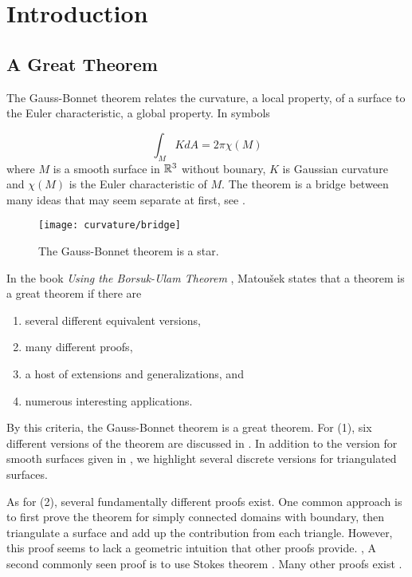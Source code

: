 \section{Introduction}
\label{sec:intro}

\subsection{A Great Theorem}
The Gauss-Bonnet theorem relates the curvature, a local property, of a surface
to the Euler characteristic, a global property. In symbols 

\begin{equation}\label{eqn:g-b-noboundary}
		\int_MK dA =2\pi \chi(M)
\end{equation}
where $M$ is a smooth surface in $\mathbb{R}^3$ without bounary, $K$ is Gaussian curvature
and $\chi(M)$ is the Euler characteristic of $M$.
The theorem is a bridge between many ideas that may
seem separate at first, see . 




\begin{figure}[htb]
\centering
\texttt{[image: curvature/bridge]}
\caption{The Gauss-Bonnet theorem is a star.}
\label{fig:bridge}
\end{figure}

In the book \emph{Using the Borsuk-Ulam Theorem}
\cite{jm08},
Matou\v{s}ek states that a theorem is a great theorem if there are
\begin{enumerate}[(1)]
\item several different equivalent versions,
\item many different proofs,
\item a host of extensions and generalizations, and
\item numerous interesting applications.
\end{enumerate}

By this criteria, the Gauss-Bonnet theorem is a great theorem.
For (1), six different versions of the theorem are discussed
in \cite{wu_historical_2008}. 
In addition to the version for smooth surfaces given in ,
we highlight
 several discrete versions for triangulated surfaces. 
  




 
 
As for (2), several fundamentally different proofs exist.  
One common approach is to first prove the theorem for simply connected domains
with boundary, then triangulate a surface and add up the contribution from each triangle.
However, this proof seems to lack a geometric intuition that other proofs provide. \cite{wu_historical_2008},
A second commonly seen proof is to use Stokes theorem  \cite{doc76,pressley_elementary_2010}.
Many other proofs exist \cite{guillemin_differential_2010,levi-bicycle,grinfeld_introduction_2013}.


